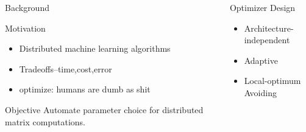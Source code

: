 \documentclass[final]{beamer}
\begin{document}
{\begin{frame}{}
\begin{center}
\begin{columns}[t]
\begin{column}{0.32\textwidth}
\begin{block}{\huge Background}
\end{block}

    \begin{block}{\huge Motivation}
\vspace{.4cm}
\begin{itemize}
\item Distributed machine learning algorithms
\item Tradeoffs--time,cost,error
\item optimize: humans are dumb as shit
\end{itemize}

\vspace{.5cm}

\end{block}

\vspace{1.2cm}

    \begin{block}{\huge Objective}
\vspace{.5cm}
{\Large Automate parameter choice for distributed matrix computations.}
    \end{block}


\vspace{1.2cm}

   
\end{column}

\begin{column}{0.32\textwidth}
 
    \begin{block}{\huge Optimizer Design}
\vspace{.5cm}

\begin{itemize}
\item Architecture-independent

\item Adaptive

\item Local-optimum Avoiding
\end{itemize}


\end{block}
\end{column}
\end{columns}
\end{center}
\end{frame}}
\end{document}

